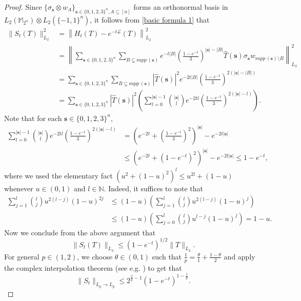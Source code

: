 \documentclass{amsbook}
\theoremstyle{definition}
\theoremstyle{remark}
\numberwithin{section}{chapter}
\numberwithin{equation}{chapter}
\newcommand{\M}{\mathbb{M}}
\newcommand{\1}{\mathbf{1}}
\newcommand{\s}{\mathbf{s}}
\newcommand{\supp}{{\mathrm supp}\,}
\begin{document}
\begin{proof}
Since $\{\sigma_{\s}\otimes w_{A}\}_{\s\in\{0,1,2,3\}^{n},A\subseteq[n]}$ forms an orthonormal basis in $L_{2}(\M_{2^{n}})\otimes L_{2}(\{-1,1\}^{n})$, it follows from \eqref{basic formula 1} that
\begin{align*}
\|S_{t}(T)\|^{2}_{L_{2}}&=\left\|H_{t}(T)-e^{-t\mathcal{L}}(T)\right\|^{2}_{L_{2}}\\
&=\left\|\sum_{\s\in\{0,1,2,3\}^{n}}\sum_{B\subsetneq \supp(\s)}e^{-t|B|}(\frac{1-e^{-t}}{3})^{|\s|-|B|}\widehat{T}(\s)\sigma_{\s} w_{\supp(\s)\setminus B}\right\|^{2}_{L_{2}}\\
&=\sum_{\s\in\{0,1,2,3\}^{n}}\sum_{B\subsetneq \supp(\s)}|\widehat{T}(\s)|^{2}e^{-2t|B|}(\frac{1-e^{-t}}{3})^{2(|\s|-|B|)}\\
&=\sum_{\s\in\{0,1,2,3\}^{n}}|\widehat{T}(\s)|^{2}\left(\sum_{l=0}^{|\s|-1}\binom{|\s|}{l}e^{-2tl}(\frac{1-e^{-t}}{3})^{2(|\s|-l)}\right).
\end{align*}
Note that for each $\s\in \{0,1,2,3\}^n$, 
\begin{align*}
	\sum_{l=0}^{|\s|-1}\binom{|\s|}{l}e^{-2tl}(\frac{1-e^{-t}}{3})^{2(|\s|-l)}&=(e^{-2t}+(\frac{1-e^{-t}}{3})^{2})^{|\s|}-e^{-2t|\s|}\\
	&\leq(e^{-2t}+(1-e^{-t})^{2})^{|\s|}-e^{-2t|\s|}\leq 1-e^{-t},
\end{align*}
where we used the elementary fact $(u^{2}+(1-u)^{2})^{l}\leq u^{2l}+(1-u)$ whenever $u\in(0,1)$ and $l\in \mathbb{N}$. Indeed,  it suffices to note that
\begin{align*}
\sum_{j=1}^{l}\binom{l}{j}u^{2(l-j)}(1-u)^{2j}&\leq(1-u)\left(\sum_{j=1}^{l}\binom{l}{j}u^{2(l-j)}(1-u)^{j}\right)\\
&\leq (1-u)\left(\sum_{j=0}^{l}\binom{l}{j}u^{l-j}(1-u)^{j}\right)=1-u.
\end{align*}
Now we conclude from the above argument that 
$$\|S_{t}(T)\|_{L_{2}}\leq (1-e^{-t})^{1/2} \|T\|_{L_2}.$$
For general $p\in(1,2)$, we choose $\theta\in(0,1)$ such that $\frac{1}{p}=\frac{\theta}{1}+\frac{1-\theta}{2}$ and apply the complex interpolation theorem (see e.g. \cite[Theorem 1.1.1]{BL1976}) to get that
\[
\|S_{t}\|_{L_{p}\to L_{p}}\leq 2^{\frac{2}{p}-1}(1-e^{-t})^{1-\frac{1}{p}}.
\]


\end{proof}
\end{document}
